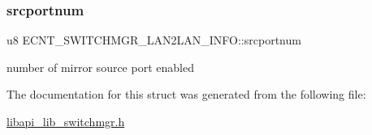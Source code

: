 \subsubsection{\texorpdfstring{srcportnum}{srcportnum}}
{\footnotesize\ttfamily u8 E\+C\+N\+T\+\_\+\+S\+W\+I\+T\+C\+H\+M\+G\+R\+\_\+\+L\+A\+N2\+L\+A\+N\+\_\+\+I\+N\+F\+O\+::srcportnum}

number of mirror source port enabled 

The documentation for this struct was generated from the following file\+:\begin{DoxyCompactItemize}
\item 
\hyperlink{libapi__lib__switchmgr_8h}{libapi\+\_\+lib\+\_\+switchmgr.\+h}\end{DoxyCompactItemize}
